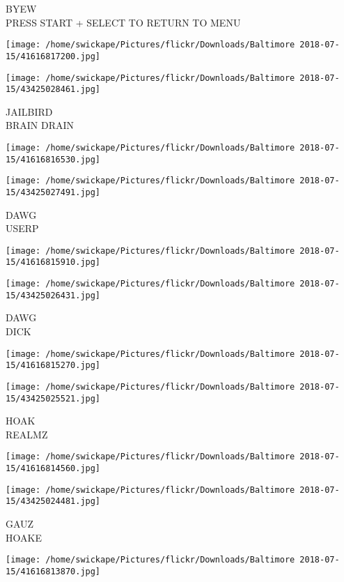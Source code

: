 \documentclass[10pt,letterpaper]{article}
\begin{document}
BYEW\\
PRESS START + SELECT TO RETURN TO MENU
\pagebreak

\texttt{[image: /home/swickape/Pictures/flickr/Downloads/Baltimore 2018-07-15/41616817200.jpg]}

\vspace{0.25in}
\texttt{[image: /home/swickape/Pictures/flickr/Downloads/Baltimore 2018-07-15/43425028461.jpg]}

JAILBIRD\\
BRAIN DRAIN
\pagebreak

\texttt{[image: /home/swickape/Pictures/flickr/Downloads/Baltimore 2018-07-15/41616816530.jpg]}

\vspace{0.25in}
\texttt{[image: /home/swickape/Pictures/flickr/Downloads/Baltimore 2018-07-15/43425027491.jpg]}

DAWG\\
USERP
\pagebreak

\texttt{[image: /home/swickape/Pictures/flickr/Downloads/Baltimore 2018-07-15/41616815910.jpg]}

\vspace{0.25in}
\texttt{[image: /home/swickape/Pictures/flickr/Downloads/Baltimore 2018-07-15/43425026431.jpg]}

DAWG\\
DICK
\pagebreak

\texttt{[image: /home/swickape/Pictures/flickr/Downloads/Baltimore 2018-07-15/41616815270.jpg]}

\vspace{0.25in}
\texttt{[image: /home/swickape/Pictures/flickr/Downloads/Baltimore 2018-07-15/43425025521.jpg]}

HOAK\\
REALMZ
\pagebreak

\texttt{[image: /home/swickape/Pictures/flickr/Downloads/Baltimore 2018-07-15/41616814560.jpg]}

\vspace{0.25in}
\texttt{[image: /home/swickape/Pictures/flickr/Downloads/Baltimore 2018-07-15/43425024481.jpg]}

GAUZ\\
HOAKE
\pagebreak

\texttt{[image: /home/swickape/Pictures/flickr/Downloads/Baltimore 2018-07-15/41616813870.jpg]}
\end{document}
